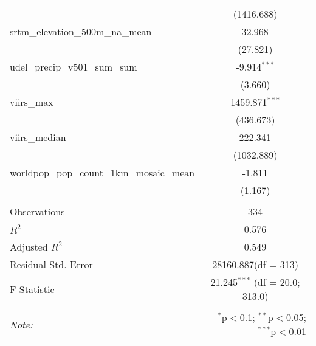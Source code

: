 \begin{table}[!htbp]
\begin{tabular}{@{\extracolsep{5pt}}lc}
  & (1416.688) \\
 srtm_elevation_500m_na_mean & 32.968$^{}$ \\
  & (27.821) \\
 udel_precip_v501_sum_sum & -9.914$^{***}$ \\
  & (3.660) \\
 viirs_max & 1459.871$^{***}$ \\
  & (436.673) \\
 viirs_median & 222.341$^{}$ \\
  & (1032.889) \\
 worldpop_pop_count_1km_mosaic_mean & -1.811$^{}$ \\
  & (1.167) \\
\hline \\[-1.8ex]
 Observations & 334 \\
 $R^2$ & 0.576 \\
 Adjusted $R^2$ & 0.549 \\
 Residual Std. Error & 28160.887(df = 313)  \\
 F Statistic & 21.245$^{***}$ (df = 20.0; 313.0) \\
\hline
\hline \\[-1.8ex]
\textit{Note:} & \multicolumn{1}{r}{$^{*}$p$<$0.1; $^{**}$p$<$0.05; $^{***}$p$<$0.01} \\
\end{tabular}
\end{table}